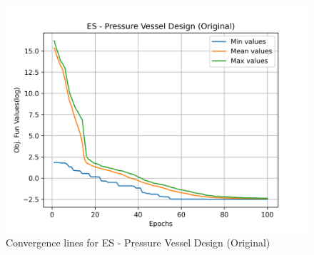 \begin{figure}[H]
        \centering
        \caption{Convergence lines for ES - Pressure Vessel Design (Original)}
        \label{fig:pressure_vessel_problem_original_solve_es}
        \includegraphics[scale=0.5]{images/pressure_vessel_problem_original_solve_es.png}
        \end{figure}
        